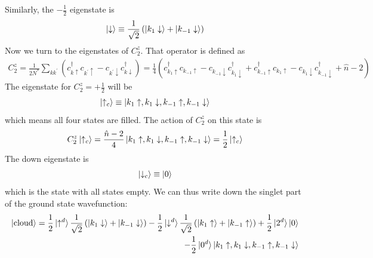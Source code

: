 \documentclass[12pt,twoside]{article}
\numberwithin{equation}{section}
\begin{document}
Similarly, the \(- \frac{1}{2}\) eigenstate is
\begin{equation}\begin{aligned}
	\ket{\downarrow} \equiv \frac{1}{\sqrt 2}\left(\ket{k_1 \downarrow} + \ket{k_{-1} \downarrow}\right)
\end{aligned}\end{equation}
Now we turn to the eigenstates of \(C_2^z\). That operator is defined as
\begin{equation}\begin{aligned}
	C_2^z = \frac{1}{2N^*}\sum_{kk^\prime}\left( c^\dagger_{k \uparrow}c_{k^\prime \uparrow} - c_{k^\prime \downarrow}c^\dagger_{k \downarrow} \right) = \frac{1}{4}\left(c^\dagger_{k_{1}\uparrow}c_{k_{-1} \uparrow} - c_{k_{-1} \downarrow}c^\dagger_{k_{1}\downarrow} + c^\dagger_{k_{-1} \uparrow}c_{k_1 \uparrow} - c_{k_1 \downarrow}c^\dagger_{k_{-1} \downarrow} + \hat n - 2\right)
\end{aligned}\end{equation}
The eigenstate for \(C_2^z = + \frac{1}{2}\) will be 
\begin{equation}\begin{aligned}
	\ket{ \uparrow_c} \equiv \ket{k_1 \uparrow, k_1 \downarrow,k_{-1} \uparrow,k_{-1} \downarrow}
\end{aligned}\end{equation}
which means all four states are filled. The action of \(C_2^z\) on this state is
\begin{equation}\begin{aligned}
	C_2^z\ket{ \uparrow_c} = \frac{\hat n -2}{4}\ket{k_1 \uparrow, k_1 \downarrow,k_{-1} \uparrow,k_{-1} \downarrow} = \frac{1}{2}\ket{ \uparrow_c}
\end{aligned}\end{equation}
The down eigenstate is
\begin{equation}\begin{aligned}
	\ket{ \downarrow_c} \equiv \ket{0}
\end{aligned}\end{equation}
which is the state with all states empty. We can thus write down the singlet part of the ground state wavefunction:
\begin{equation}\begin{aligned}
	\ket{\text{cloud}} = \frac{1}{2}\ket{\uparrow^d}\frac{1}{\sqrt 2}\left(\ket{k_1 \downarrow} + \ket{k_{-1} \downarrow}\right) - \frac{1}{2}\ket{\downarrow^d}\frac{1}{\sqrt 2}\left(\ket{k_1 \uparrow} + \ket{k_{-1} \uparrow}\right) + \frac{1}{2}\ket{2^d}\ket{0} \\
	- \frac{1}{2}\ket{0^d}\ket{k_1 \uparrow, k_1 \downarrow,k_{-1} \uparrow,k_{-1} \downarrow}
\end{aligned}\end{equation}
\end{document}
